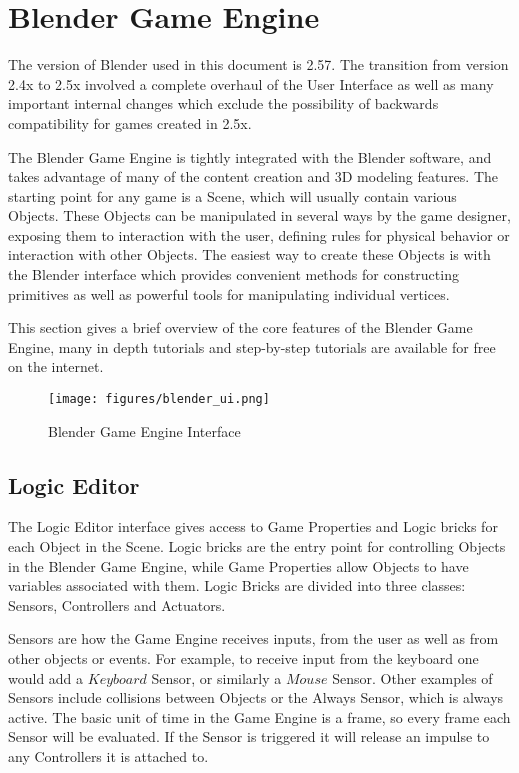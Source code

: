 \section{Blender Game Engine}

The version of Blender used in this document is 2.57. The transition from
version 2.4x to 2.5x involved a complete overhaul of the User Interface as well
as many important internal changes which exclude the possibility of backwards
compatibility for games created in 2.5x.


The Blender Game Engine is tightly integrated with the Blender software, and
takes advantage of many of the content creation and 3D modeling features. The
starting point for any game is a Scene, which will usually contain various
Objects. These Objects can be manipulated in several ways by the game designer,
exposing them to interaction with the user, defining rules for physical
behavior or interaction with other Objects. The easiest way to create these
Objects is with the Blender interface which provides convenient methods for
constructing primitives as well as powerful tools for manipulating individual
vertices.


This section gives a brief overview of the core features of the Blender Game
Engine, many in depth tutorials and step-by-step tutorials are available for
free on the internet.



\begin{figure}[!htc]
 		\centering
		\texttt{[image: figures/blender\_ui.png]}
		\label{fig:logic}
        \caption{ Blender Game Engine Interface }
\end{figure}

\subsection{Logic Editor}

The Logic Editor interface gives access to Game Properties and Logic bricks for
each Object in the Scene.  Logic bricks are the entry point for controlling
Objects in the Blender Game Engine, while Game Properties allow Objects to have
variables associated with them. Logic Bricks are divided into three classes:
Sensors, Controllers and Actuators.

Sensors are how the Game Engine receives inputs, from the user as well as from
other objects or events. For example, to receive input from the keyboard one
would add a $Keyboard$ Sensor, or similarly a $Mouse$ Sensor. Other examples of
Sensors include collisions between Objects or the Always Sensor, which is
always active. The basic unit of time in the Game Engine is a frame,
so every frame each Sensor will be evaluated. If the Sensor is triggered it
will release an impulse to any Controllers it is attached to.


